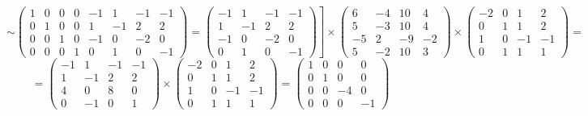 \documentclass{article}
\begin{document}
$$\left.\sim \left(\begin{array}{cccc|cccc}
1 & 0 & 0 & 0 & -1 & 1 & -1 & -1\\
0 & 1 & 0 & 0 & 1 & -1 & 2 & 2 \\
0 & 0 & 1 & 0 & -1 & 0 & -2 & 0\\
0 & 0 & 0 & 1 & 0 & 1 & 0 & -1
\end{array}\right) = \begin{pmatrix}
-1 & 1 & -1 & -1 \\
1 & -1 & 2 & 2 \\
-1 & 0 & -2 & 0 \\
0 & 1 & 0 & -1
\end{pmatrix}\right] \times \begin{pmatrix}
6 & -4 & 10 & 4 \\
5 & -3 & 10 & 4 \\
-5 & 2 & -9 & -2 \\
5 & -2 & 10 & 3
\end{pmatrix} \times \begin{pmatrix}
-2 & 0 & 1 & 2 \\
0 & 1 & 1 & 2 \\
1 & 0 & -1 & -1 \\
0 & 1 & 1 & 1
\end{pmatrix} =$$
$$= \begin{pmatrix}
-1 & 1 & -1 & -1 \\
1 & -1 & 2 & 2 \\
4 & 0 & 8 & 0 \\
0 & -1 & 0 & 1
\end{pmatrix} \times \begin{pmatrix}
-2 & 0 & 1 & 2 \\
0 & 1 & 1 & 2 \\
1 & 0 & -1 & -1 \\
0 & 1 & 1 & 1
\end{pmatrix} = \begin{pmatrix}
1 & 0 & 0 & 0 \\
0 & 1 & 0 & 0 \\
0 & 0 & -4 & 0 \\
0 & 0 & 0 & -1
\end{pmatrix}$$
\end{document}
